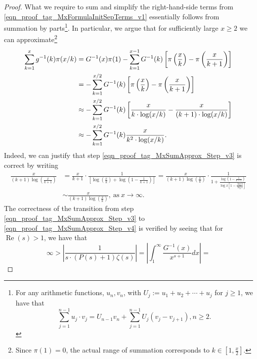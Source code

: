 \documentclass[11pt,reqno,a4letter]{article}
\numberwithin{figure}{section}
\numberwithin{table}{section}
\theoremstyle{plain}
\numberwithin{theorem}{section}
\theoremstyle{definition}
\renewcommand{\Re}{\operatorname{Re}}
\begin{document}
\begin{proof}
What we require to sum and simplify the right-hand-side terms from 
\eqref{eqn_proof_tag_MxFormulaInitSepTerms_v1} essentially follows from 
summation by parts\footnote{
     For any arithmetic functions, $u_n,v_n$, 
     with $U_j := u_1+u_2+\cdots+u_j$ for $j \geq 1$, we have that 
     \cite[\S 2.10(ii)]{NISTHB} 
     \[
     \sum_{j=1}^{n-1} u_j \cdot v_j = U_{n-1} v_n + 
          \sum_{j=1}^{n-1} U_j \left(v_j - v_{j+1}\right), n \geq 2. 
     \]
}. 
In particular, we argue that for sufficiently large 
$x \geq 2$ we can approximate\footnote{
     Since $\pi(1) = 0$, the actual range of summation corresponds to 
     $k \in \left[1, \frac{x}{2}\right]$. 
}
\begin{subequations}
\begin{align} 
\notag 
\sum_{k=1}^{x} g^{-1}(k) \pi(x/k) & = G^{-1}(x) \pi(1) - \sum_{k=1}^{x-1} G^{-1}(k) \left[ 
     \pi\left(\frac{x}{k}\right) - \pi\left(\frac{x}{k+1}\right)\right] \\ 
\notag
     & = -\sum_{k=1}^{x/2} G^{-1}(k) \left[ 
     \pi\left(\frac{x}{k}\right) - \pi\left(\frac{x}{k+1}\right)\right] \\ 
\label{eqn_proof_tag_MxSumApprox_Step_v3} 
     & \approx -\sum_{k=1}^{x/2} G^{-1}(k) \left[ 
     \frac{x}{k \cdot \log(x/k)} - \frac{x}{(k+1) \cdot \log(x/k)}\right] \\ 
\label{eqn_proof_tag_MxSumApprox_Step_v4} 
     & \approx -\sum_{k=1}^{x/2} G^{-1}(k) \frac{x}{k^2 \cdot \log(x/k)}. 
\end{align} 
\end{subequations} 
Indeed, we can justify that step \eqref{eqn_proof_tag_MxSumApprox_Step_v3} is 
correct by writing 
\begin{align*} 
\frac{x}{(k+1) \log\left(\frac{x}{k+1}\right)} & = \frac{x}{k+1} \cdot 
     \frac{1}{\left[\log\left(\frac{x}{k}\right) + \log\left(1 - \frac{1}{k+1}\right)\right]} 
     = \frac{x}{(k+1) \log\left(\frac{x}{k}\right)} \cdot 
     \frac{1}{1 + \frac{\log\left(1 - \frac{1}{k+1}\right)}{\log x \left[ 
     1 - \frac{\log k}{\log x}\right]}} \\ 
     & \sim \frac{x}{(k+1) \log\left(\frac{x}{k}\right)}, \mathrm{\ as\ } x \rightarrow \infty. 
\end{align*} 
The correctness of the transition from 
step \eqref{eqn_proof_tag_MxSumApprox_Step_v3} to \eqref{eqn_proof_tag_MxSumApprox_Step_v4} is 
verified by seeing that for $\Re(s) > 1$, we have that 
\[
\infty > \left\lvert \frac{1}{s \cdot (P(s) + 1) \zeta(s)} \right\rvert = 
     \left\lvert \int_1^{\infty} \frac{G^{-1}(x)}{x^{s+1}} dx \right\rvert = 
\]
\end{proof}
\end{document}
